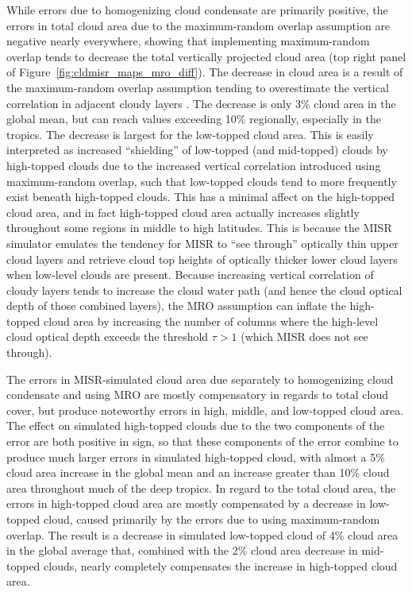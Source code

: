 While errors due to homogenizing cloud condensate are primarily
positive, the errors in total cloud area due to the maximum-random
overlap assumption are negative nearly everywhere, showing that
implementing maximum-random overlap tends to decrease the total
vertically projected cloud area (top right panel of
Figure~\ref{fig:cldmisr_maps_mro_diff}). The decrease in cloud area is a
result of the maximum-random overlap assumption tending to overestimate
the vertical correlation in adjacent cloudy layers
\citep[e.g.,][]{mace_and_benson-troth_2002, hogan_and_illingworth_2000, barker_2008}.
The decrease is only 3\% cloud area in the global mean, but can reach
values exceeding 10\% regionally, especially in the tropics. The
decrease is largest for the low-topped cloud area. This is easily
interpreted as increased ``shielding'' of low-topped (and mid-topped)
clouds by high-topped clouds due to the increased vertical correlation
introduced using maximum-random overlap, such that low-topped clouds
tend to more frequently exist beneath high-topped clouds. This has a
minimal affect on the high-topped cloud area, and in fact high-topped
cloud area actually increases slightly throughout some regions in middle
to high latitudes. This is because the MISR simulator emulates the
tendency for MISR to ``see through'' optically thin upper cloud layers
and retrieve cloud top heights of optically thicker lower cloud layers
when low-level clouds are present. Because increasing vertical
correlation of cloudy layers tends to increase the cloud water path (and
hence the cloud optical depth of those combined layers), the MRO
assumption can inflate the high-topped cloud area by increasing the
number of columns where the high-level cloud optical depth exceeds the
threshold \(\tau > 1\) (which MISR does not see through).

The errors in MISR-simulated cloud area due separately to homogenizing
cloud condensate and using MRO are mostly compensatory in regards to
total cloud cover, but produce noteworthy errors in high, middle, and
low-topped cloud area. The effect on simulated high-topped clouds due to
the two components of the error are both positive in sign, so that these
components of the error combine to produce much larger errors in
simulated high-topped cloud, with almost a 5\% cloud area increase in
the global mean and an increase greater than 10\% cloud area throughout
much of the deep tropics. In regard to the total cloud area, the errors
in high-topped cloud area are mostly compensated by a decrease in
low-topped cloud, caused primarily by the errors due to using
maximum-random overlap. The result is a decrease in simulated low-topped
cloud of 4\% cloud area in the global average that, combined with the
2\% cloud area decrease in mid-topped clouds, nearly completely
compensates the increase in high-topped cloud area.

